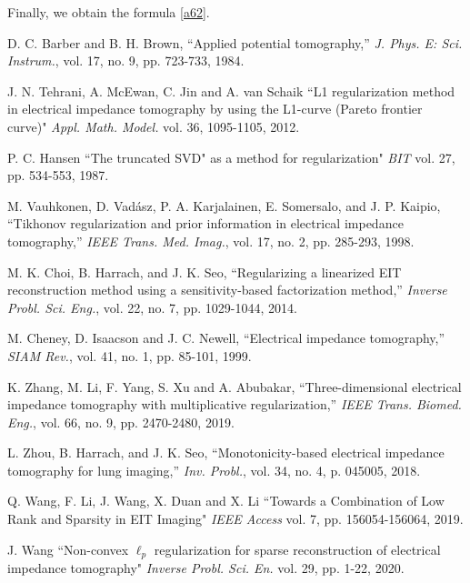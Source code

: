 \documentclass[lettersize,journal]{IEEEtran}
\begin{document}
Finally, we obtain the formula \eqref{a62}.





\begin{thebibliography}{00}

 D. C. Barber and B. H. Brown, ``Applied potential tomography,'' \emph{J. Phys. E: Sci. Instrum.}, vol. 17, no. 9, pp. 723-733, 1984.

 J. N. Tehrani, A. McEwan, C. Jin and A. van Schaik ``L1 regularization method in electrical impedance tomography by using the L1-curve (Pareto frontier curve)" \emph{Appl. Math. Model.} vol. 36, 1095-1105, 2012.

 P. C. Hansen ``The truncated SVD" as a method for regularization" \emph{BIT} vol. 27, pp. 534-553, 1987.

 M. Vauhkonen, D. Vad\'{a}sz, P. A. Karjalainen, E. Somersalo, and J. P. Kaipio, ``Tikhonov regularization and prior information in electrical impedance tomography,'' \emph{IEEE Trans. Med. Imag.}, vol. 17, no. 2, pp. 285-293, 1998.

 M. K. Choi, B. Harrach, and J. K. Seo, ``Regularizing a linearized EIT reconstruction method using a sensitivity-based factorization method,'' \emph{Inverse Probl. Sci. Eng.}, vol. 22, no. 7, pp. 1029-1044, 2014.

 M. Cheney, D. Isaacson and J. C. Newell, ``Electrical impedance tomography,'' \emph{SIAM Rev.}, vol. 41, no. 1, pp. 85-101, 1999.

 K. Zhang, M. Li, F. Yang, S. Xu and A. Abubakar, ``Three-dimensional electrical impedance tomography with multiplicative regularization,'' \emph{IEEE Trans. Biomed. Eng.}, vol. 66, no. 9, pp. 2470-2480, 2019.

 L. Zhou, B. Harrach, and J. K. Seo, ``Monotonicity-based electrical impedance tomography for lung imaging,'' \emph{Inv. Probl.}, vol. 34, no. 4, p. 045005, 2018.

 Q. Wang, F. Li, J. Wang, X. Duan and X. Li ``Towards a Combination of Low Rank and Sparsity in EIT Imaging" \emph{IEEE Access} vol. 7, pp. 156054-156064, 2019.

 J. Wang ``Non-convex $\ell_p$ regularization for sparse reconstruction of electrical impedance tomography" \emph{Inverse Probl. Sci. En.} vol. 29, pp. 1-22, 2020.


\end{thebibliography}
\end{document}
